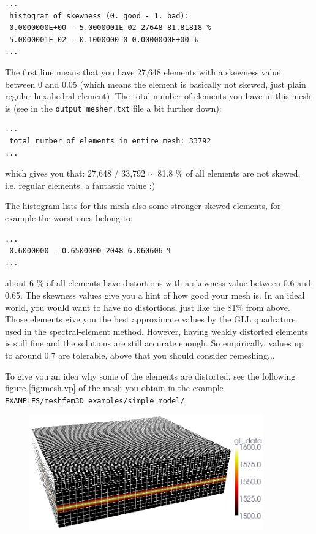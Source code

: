 \begin{description}
{\footnotesize
\begin{verbatim}
...
 histogram of skewness (0. good - 1. bad):
 0.0000000E+00 - 5.0000001E-02 27648 81.81818 %
 5.0000001E-02 - 0.1000000 0 0.0000000E+00 %
...
\end{verbatim}
}

The first line means that you have 27,648 elements with a skewness
value between 0 and 0.05 (which means the element is basically not
skewed, just plain regular hexahedral element). The total number of
elements you have in this mesh is (see in the \texttt{output\_mesher.txt}
file a bit further down):

{\footnotesize
\begin{verbatim}
...
 total number of elements in entire mesh: 33792
...
\end{verbatim}
}

which gives you that: 27,648 / 33,792 $\sim$ 81.8 \% of all elements
are not skewed, i.e. regular elements. a fantastic value :)


The histogram lists for this mesh also some stronger skewed elements,
for example the worst ones belong to:

{\footnotesize
\begin{verbatim}
...
 0.6000000 - 0.6500000 2048 6.060606 %
...

\end{verbatim}
}

about 6 \% of all elements have distortions with a skewness value
between 0.6 and 0.65. The skewness values give you a hint of how good
your mesh is. In an ideal world, you would want to have no distortions,
just like the 81\% from above. Those elements give you the best approximate
values by the GLL quadrature used in the spectral-element method.
However, having weakly distorted elements is still fine and the solutions
are still accurate enough. So empirically, values up to around 0.7
are tolerable, above that you should consider remeshing...


To give you an idea why some of the elements are distorted, see the
following figure \ref{fig:mesh.vp} of the mesh you obtain in the
example \texttt{EXAMPLES/meshfem3D\_examples/simple\_model/}.
\begin{figure}[htbp]
\noindent \begin{centering}
\includegraphics[width=0.9\textwidth]{figures/mesh_vp.jpg}
\par\end{centering}


\end{figure}
\end{description}
